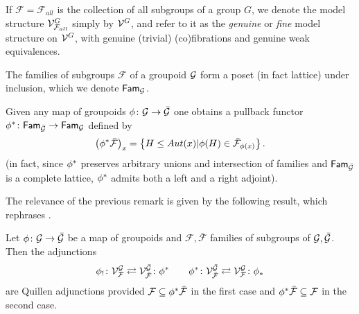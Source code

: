 \documentclass[a4paper,10pt
,draft
]{article}%
\renewcommand{\F}{\mathcal F}
\renewcommand{\1}{\eta}%
\begin{document}
\begin{definition}\label{GENMOD DEF}
If $\F = \F_{all}$ is the collection of all subgroups of a group $G$, we denote the model structure $\V^{G}_{\F_{all}}$ simply by $\mathcal V^G$,
and refer to it as the \textit{genuine} or \textit{fine} model structure on $\mathcal V^G$,
with genuine (trivial) (co)fibrations and genuine weak equivalences.
\end{definition}


\begin{remark}
The families of subgroups $\F$ of a groupoid $\mathcal{G}$ 
form a poset (in fact lattice) under inclusion,
which we denote $\mathsf{Fam}_{\mathcal{G}}$. 

Given any map of groupoids $\phi\colon \mathcal{G} \to \bar{\mathcal{G}}$
one obtains a pullback functor
$\phi^{\**} \colon \mathsf{Fam}_{\bar{\G}} \to \mathsf{Fam}_{\G}$
defined by
\[
\left(\phi^{\**} \bar{\F} \right)_{x}
=
\left\{H \leq Aut(x)| \phi(H) \in \bar{\F}_{\phi(x)}\right\}.
\]
(in fact, since $\phi^{\**}$ preserves arbitrary unions and intersection of families and 
$\mathsf{Fam}_{\bar{\mathcal{G}}}$
is a complete lattice, $\phi^{\**}$ admits both a left and a right adjoint).
\end{remark}

The relevance of the previous remark is given by the following result,
which rephrases \cite[Props. 6.6, 6.7]{BP_geo}.

\begin{proposition}\label{EQQUILADJ PROP}
Let $\phi \colon \mathcal{G} \to \bar{\mathcal{G}}$
be a map of groupoids and
$\F,\bar{\F}$ families of subgroups of $\mathcal{G},\bar{\mathcal{G}}$.
Then the adjunctions
\[
	\phi_! \colon \V^{\G}_{\F}
	\rightleftarrows
	\V^{\bar{\G}}_{\bar{\F}} \colon \phi^{\**}
\qquad
	\phi^{\**} \colon \V^{\bar{\G}}_{\bar{\F}} 
	\rightleftarrows
	\V^{\G}_{\F} \colon \phi_{\**}
\]
are Quillen adjunctions provided
$\F \subseteq \phi^{\**} \bar{\F}$
in the first case and 
$\phi^{\**} \bar{\F} \subseteq \F$
in the second case.
\end{proposition}
\end{document}
